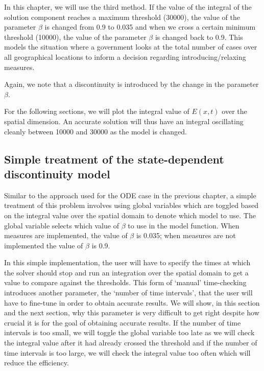 In this chapter, we will use the third method. If the value of the integral of the solution component reaches a maximum threshold (30000), the value of the parameter $\beta$ is changed from 0.9 to 0.035 and when we cross a certain minimum threshold (10000), the value of the parameter $\beta$ is changed back to 0.9. This models the situation where a government looks at the total number of cases over all geographical locations to inform a decision regarding introducing/relaxing measures.

Again, we note that a discontinuity is introduced by the change in the parameter $\beta$.

For the following sections, we will plot the integral value of $E(x, t)$ over the spatial dimension. An accurate solution will thus have an integral oscillating cleanly between 10000 and 30000 as the model is changed.

\subsection{Simple treatment of the state-dependent discontinuity model}
\label{subsubsection:pde_state_naive}
Similar to the approach used for the ODE case in the previous chapter, a simple treatment of this problem involves using global variables which are toggled based on the integral value over the spatial domain to denote which model to use. The global variable selects which value of $\beta$ to use in the model function. When measures are implemented, the value of $\beta$ is 0.035; when measures are not implemented the value of $\beta$ is 0.9.

In this simple implementation, the user will have to specify the times at which the solver should stop and run an integration over the spatial domain to get a value to compare against the thresholds. This form of `manual' time-checking introduces another parameter, the `number of time intervals', that the user will have to fine-tune in order to obtain accurate results. We will show, in this section and the next section, why this parameter is very difficult to get right despite how crucial it is for the goal of obtaining accurate results. If the number of time intervals is too small, we will toggle the global variable too late as we will check the integral value after it had already crossed the threshold and if the number of time intervals is too large, we will check the integral value too often which will reduce the efficiency. 


